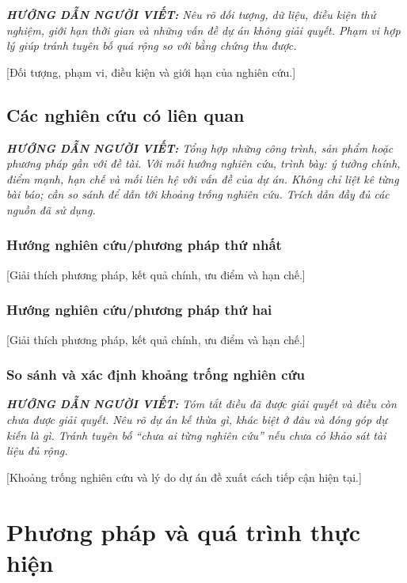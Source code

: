 \documentclass[12pt,a4paper]{report}
\newcommand{\huongdan}[1]{%
  \par\smallskip\noindent
  \textit{\textbf{HƯỚNG DẪN NGƯỜI VIẾT:} #1}%
  \par\smallskip}
\begin{document}
\huongdan{Nêu rõ đối tượng, dữ liệu, điều kiện thử nghiệm, giới hạn thời gian
và những vấn đề dự án không giải quyết. Phạm vi hợp lý giúp tránh tuyên bố
quá rộng so với bằng chứng thu được.}

[Đối tượng, phạm vi, điều kiện và giới hạn của nghiên cứu.]

\section{Các nghiên cứu có liên quan}

\huongdan{Tổng hợp những công trình, sản phẩm hoặc phương pháp gần với đề tài.
Với mỗi hướng nghiên cứu, trình bày: ý tưởng chính, điểm mạnh, hạn chế và
mối liên hệ với vấn đề của dự án. Không chỉ liệt kê từng bài báo; cần so sánh
để dẫn tới khoảng trống nghiên cứu. Trích dẫn đầy đủ các nguồn đã sử dụng.}

\subsection{Hướng nghiên cứu/phương pháp thứ nhất}

[Giải thích phương pháp, kết quả chính, ưu điểm và hạn chế.] \citep{ref1}

\subsection{Hướng nghiên cứu/phương pháp thứ hai}

[Giải thích phương pháp, kết quả chính, ưu điểm và hạn chế.] \citep{ref2}

\subsection{So sánh và xác định khoảng trống nghiên cứu}

\huongdan{Tóm tắt điều đã được giải quyết và điều còn chưa được giải quyết.
Nêu rõ dự án kế thừa gì, khác biệt ở đâu và đóng góp dự kiến là gì. Tránh
tuyên bố ``chưa ai từng nghiên cứu'' nếu chưa có khảo sát tài liệu đủ rộng.}

[Khoảng trống nghiên cứu và lý do dự án đề xuất cách tiếp cận hiện tại.]

\chapter{Phương pháp và quá trình thực hiện}
\end{document}

